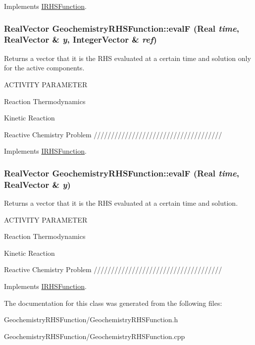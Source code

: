 Implements \hyperlink{classIRHSFunction}{IRHSFunction}.\hypertarget{classGeochemistryRHSFunction_a55eef411737aff551702c1a56d9673a1}{
\subsubsection[{evalF}]{\setlength{\rightskip}{0pt plus 5cm}RealVector GeochemistryRHSFunction::evalF (Real {\em time}, \/  RealVector \& {\em y}, \/  IntegerVector \& {\em ref})}}
\label{classGeochemistryRHSFunction_a55eef411737aff551702c1a56d9673a1}


Returns a vector that it is the RHS evaluated at a certain time and solution only for the active components. 

ACTIVITY PARAMETER

Reaction Thermodynamics

Kinetic Reaction

Reactive Chemistry Problem ///////////////////////////////////// 

Implements \hyperlink{classIRHSFunction}{IRHSFunction}.\hypertarget{classGeochemistryRHSFunction_a2f7125c7c0ae977aea796acc9ea63e82}{
\subsubsection[{evalF}]{\setlength{\rightskip}{0pt plus 5cm}RealVector GeochemistryRHSFunction::evalF (Real {\em time}, \/  RealVector \& {\em y})}}
\label{classGeochemistryRHSFunction_a2f7125c7c0ae977aea796acc9ea63e82}


Returns a vector that it is the RHS evaluated at a certain time and solution. 

ACTIVITY PARAMETER

Reaction Thermodynamics

Kinetic Reaction

Reactive Chemistry Problem ///////////////////////////////////// 

Implements \hyperlink{classIRHSFunction}{IRHSFunction}.

The documentation for this class was generated from the following files:\begin{DoxyCompactItemize}
\item 
GeochemistryRHSFunction/GeochemistryRHSFunction.h\item 
GeochemistryRHSFunction/GeochemistryRHSFunction.cpp\end{DoxyCompactItemize}
